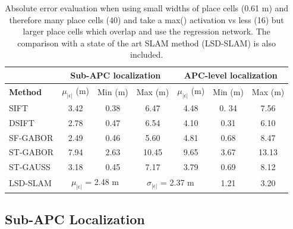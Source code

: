 \begin{table}[h]
\centering
    \begin{tabular}{lcccccc}
    ~		 & \multicolumn{3}{c}{\textbf{Sub-APC localization}} & \multicolumn{3}{c}{\textbf{APC-level localization}} \\ \hline
    \textbf{Method}        & $\mu_{|\epsilon|}$ (m) & Min (m) & Max (m) & $\mu_{|\epsilon|}$ (m) &  Min (m) & Max (m) \\ \hline
    SIFT     & 3.42   & 0.38 & 6.47 & 4.48   & 0. 34 &  7.56\\ \hline
    DSIFT    & 2.78   & 0.47 & 6.54  & 4.10   & 0.31 & 6.10 \\ \hline
    SF-GABOR & 2.49   & 0.46 & 5.60 & 4.81   & 0.68  & 8.47 \\ \hline
    ST-GABOR & 7.94   & 2.63 & 10.45 & 9.65   & 3.67 & 13.13\\ \hline
    ST-GAUSS & 3.18   & 0.45 & 7.17 & 3.79   & 0.69  & 8.12 \\ \hline
    LSD-SLAM & \multicolumn{2}{c}{$\mu_{|\epsilon|}$ = 2.48 m } & \multicolumn{2}{c}{$\sigma_{|\epsilon|}$ = 2.37 m} & 1.21 & 3.20 \\ \hline
    \end{tabular}
    \caption {Absolute error evaluation when using small widths of place cells (0.61 m) and therefore many place cells (40) and take a max() activation vs less (16) but larger place cells which overlap and use the regression network. The comparison with a state of the art SLAM method (LSD-SLAM) is also included.}
    \label{table:methodComparison}
\end{table}





\subsection{Sub-APC Localization}


